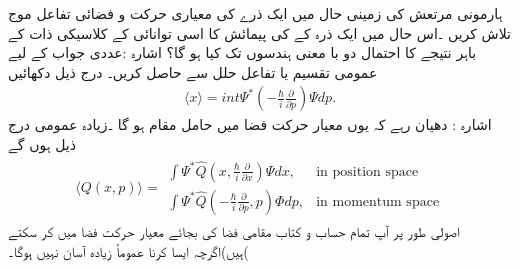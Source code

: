 



ہارمونی مرتعش کی زمینی حال میں ایک ذرے کی معیاری حرکت و فضائی تفاعل موج  تلاش کریں ۔اس حال میں ایک ذرہ کے  کی پیمائش کا اسی توانائی کے کلاسیکی ذات کے باہر نتیجے کا احتمال دو با معنی ہندسوں تک کیا ہو گا؟ اشارہ :عددی جواب کے لیے عمومی تقسیم یا تفاعل حلل سے حاصل کریں۔
درج ذیل دکھائیں
\begin{align}
\langle x \rangle = int \Psi^{*} \left( - \frac{\hbar}{i} \frac{\partial}{\partial p} \right) \Psi dp.
\end{align}
اشارہ : دھیان رہے کہ  یوں معیار حرکت فضا میں حامل مقام  ہو گا ۔زیادہ عمومی درج ذیل ہوں گے
\begin{align}
\langle Q(x,p)\rangle =  \begin{array}{ll} 
\int \Psi^{*} \hat{Q} \left( x, \frac{\hbar}{i} \frac{\partial}{\partial x} \right) \Psi dx, & \text{in position space} \\
\int \Psi^{*}\hat{Q} \left( -\frac{\hbar}{i} \frac{\partial}{\partial p},p \right) \Phi dp, & \text{in momentum space} 
\end{array}
\end{align}
اصولی طور پر آپ تمام حساب و کتاب مقامی فضا کی بجائے معیار حرکت فضا میں کر سکتے ہیں)اگرچہ ایسا کرنا عموماً زیادہ آسان نہیں ہوگا۔(
